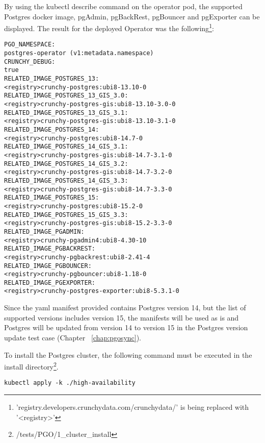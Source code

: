 \label{chap:pgoclusterinstall}
By using the kubectl describe command on the operator pod, the supported Postgres docker image, pgAdmin, pgBackRest, pgBouncer and pgExporter can be displayed. The result for the deployed Operator was the following\footnote{'registry.developers.crunchydata.com/crunchydata/' is being replaced with '<registry>'}:

\begin{verbatim}
PGO_NAMESPACE:                      
postgres-operator (v1:metadata.namespace)                                    
CRUNCHY_DEBUG:                      
true                                  
RELATED_IMAGE_POSTGRES_13:          
<registry>crunchy-postgres:ubi8-13.10-0
RELATED_IMAGE_POSTGRES_13_GIS_3.0:  
<registry>crunchy-postgres-gis:ubi8-13.10-3.0-0                               
RELATED_IMAGE_POSTGRES_13_GIS_3.1:  
<registry>crunchy-postgres-gis:ubi8-13.10-3.1-0                               
RELATED_IMAGE_POSTGRES_14:          
<registry>crunchy-postgres:ubi8-14.7-0 
RELATED_IMAGE_POSTGRES_14_GIS_3.1:  
<registry>crunchy-postgres-gis:ubi8-14.7-3.1-0                                
RELATED_IMAGE_POSTGRES_14_GIS_3.2:  
<registry>crunchy-postgres-gis:ubi8-14.7-3.2-0                                
RELATED_IMAGE_POSTGRES_14_GIS_3.3:  
<registry>crunchy-postgres-gis:ubi8-14.7-3.3-0                                
RELATED_IMAGE_POSTGRES_15:          
<registry>crunchy-postgres:ubi8-15.2-0 
RELATED_IMAGE_POSTGRES_15_GIS_3.3:  
<registry>crunchy-postgres-gis:ubi8-15.2-3.3-0                                
RELATED_IMAGE_PGADMIN:              
<registry>crunchy-pgadmin4:ubi8-4.30-10
RELATED_IMAGE_PGBACKREST:           
<registry>crunchy-pgbackrest:ubi8-2.41-4                                      
RELATED_IMAGE_PGBOUNCER:            
<registry>crunchy-pgbouncer:ubi8-1.18-0
RELATED_IMAGE_PGEXPORTER:           
<registry>crunchy-postgres-exporter:ubi8-5.3.1-0
\end{verbatim}

Since the yaml manifest provided contains Postgres version 14, but the list of supported versions includes version 15, the manifests will be used as is and Postgres will be updated from version 14 to version 15 in the Postgres version update test case (Chapter ~\ref{chap:pgosync}).

To install the Postgres cluster, the following command must be executed in the install directory\footnote{/tests/PGO/1\_cluster\_install}.
\begin{verbatim}
kubectl apply -k ./high-availability
\end{verbatim}


